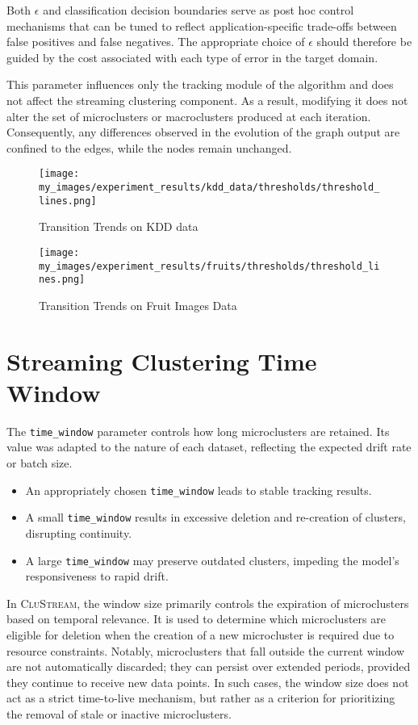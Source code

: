 Both $\epsilon$ and classification decision boundaries serve as post hoc control
mechanisms that can be tuned to reflect application-specific trade-offs between
false positives and false negatives. The appropriate choice of $\epsilon$ should
therefore be guided by the cost associated with each type of error in the
target domain.

This parameter influences only the tracking module of the algorithm and does
not affect the streaming clustering component. As a result, modifying it does
not alter the set of microclusters or macroclusters produced at each iteration.
Consequently, any differences observed in the evolution of the graph output are
confined to the edges, while the nodes remain unchanged.

\begin{figure}[H]
      \centering
      \texttt{[image: my\_images/experiment\_results/kdd\_data/thresholds/threshold\_lines.png]}
      \caption{Transition Trends on KDD data}
\end{figure}

\begin{figure}[H]
      \centering
      \texttt{[image: my\_images/experiment\_results/fruits/thresholds/threshold\_lines.png]}
      \caption{Transition Trends on Fruit Images Data}
\end{figure}

\section{Streaming Clustering Time Window}

The \texttt{time\_window} parameter controls how long microclusters are
retained. Its value was adapted to the nature of each dataset, reflecting the
expected drift rate or batch size.

\begin{itemize}
      \item An appropriately chosen \texttt{time\_window} leads to stable tracking results.
      \item A small \texttt{time\_window} results in excessive deletion and re-creation of
            clusters, disrupting continuity.
      \item A large \texttt{time\_window} may preserve outdated clusters, impeding the
            model's responsiveness to rapid drift.
\end{itemize}

In \textsc{CluStream}, the window size primarily controls the expiration of
microclusters based on temporal relevance. It is used to determine which
microclusters are eligible for deletion when the creation of a new microcluster
is required due to resource constraints. Notably, microclusters that fall
outside the current window are not automatically discarded; they can persist
over extended periods, provided they continue to receive new data points. In
such cases, the window size does not act as a strict time-to-live mechanism,
but rather as a criterion for prioritizing the removal of stale or inactive
microclusters.

